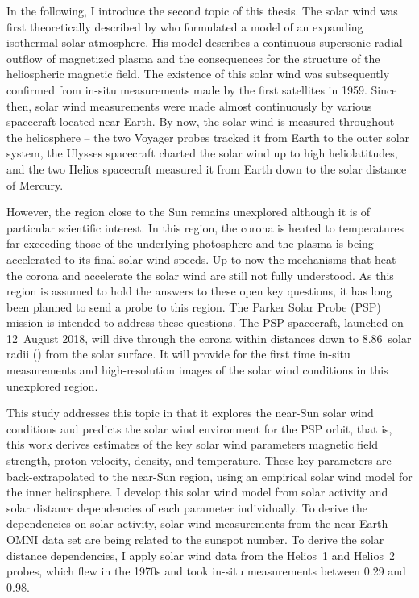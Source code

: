 In the following, I introduce the second topic of this thesis.
The solar wind was first theoretically described by \citet{Parker1958} who formulated a model of an expanding isothermal solar atmosphere. His model describes a continuous supersonic radial outflow of magnetized plasma and the consequences for the structure of the heliospheric magnetic field. The existence of this solar wind was subsequently confirmed from in-situ measurements made by the first satellites in 1959. Since then, solar wind measurements were made almost continuously by various spacecraft located near Earth. By now, the solar wind is measured throughout the heliosphere -- the two Voyager probes tracked it from Earth to the outer solar system, the Ulysses spacecraft charted the solar wind up to high heliolatitudes, and the two Helios spacecraft measured it from Earth down to the solar distance of Mercury.

However, the region close to the Sun remains unexplored although it is of particular scientific interest. In this region, the corona is heated to temperatures far exceeding those of the underlying photosphere and the plasma is being accelerated to its final solar wind speeds. Up to now the mechanisms that heat the corona and accelerate the solar wind are still not fully understood.
As this region is assumed to hold the answers to these open key questions, it has long been planned to send a probe to this region. The Parker Solar Probe (PSP) mission is intended to address these questions. The PSP spacecraft, launched on 12~August 2018, will dive through the corona within distances down to \num{8.86}~solar radii (\Rs) from the solar surface. It will provide for the first time in-situ measurements and high-resolution images of the solar wind conditions in this unexplored region.

This study addresses this topic in that it explores the near-Sun solar wind conditions and predicts the solar wind environment for the PSP orbit, that is, this work derives estimates of the key solar wind parameters magnetic field strength, proton velocity, density, and temperature. These key parameters are back-extrapolated to the near-Sun region, using an empirical solar wind model for the inner heliosphere.
I develop this solar wind model from solar activity and solar distance dependencies of each parameter individually. To derive the dependencies on solar activity, solar wind measurements from the near-Earth OMNI data set are being related to the sunspot number. To derive the solar distance dependencies, I apply solar wind data from the Helios~1 and Helios~2 probes, which flew in the 1970s and took in-situ measurements between \SI{0.29}{\au} and \SI{0.98}{\au}.

